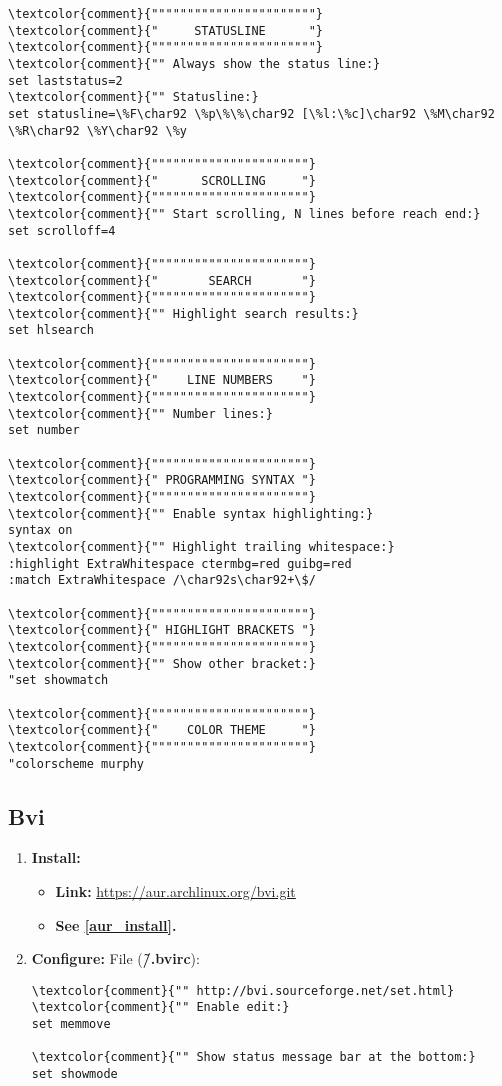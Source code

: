 \documentclass[10pt, a4paper, onecolumn, openany]{book} %
\begin{document}
\begin{enumerate}
\begin{Verbatim}[commandchars=\\\{\}]
\textcolor{comment}{"""""""""""""""""""""""}
\textcolor{comment}{"     STATUSLINE      "}
\textcolor{comment}{"""""""""""""""""""""""}
\textcolor{comment}{"" Always show the status line:}
set laststatus=2
\textcolor{comment}{"" Statusline:}
set statusline=\%F\char92 \%p\%\%\char92 [\%l:\%c]\char92 \%M\char92 \%R\char92 \%Y\char92 \%y

\textcolor{comment}{""""""""""""""""""""""}
\textcolor{comment}{"      SCROLLING     "}
\textcolor{comment}{""""""""""""""""""""""}
\textcolor{comment}{"" Start scrolling, N lines before reach end:}
set scrolloff=4

\textcolor{comment}{""""""""""""""""""""""}
\textcolor{comment}{"       SEARCH       "}
\textcolor{comment}{""""""""""""""""""""""}
\textcolor{comment}{"" Highlight search results:}
set hlsearch

\textcolor{comment}{""""""""""""""""""""""}
\textcolor{comment}{"    LINE NUMBERS    "}
\textcolor{comment}{""""""""""""""""""""""}
\textcolor{comment}{"" Number lines:}
set number

\textcolor{comment}{""""""""""""""""""""""}
\textcolor{comment}{" PROGRAMMING SYNTAX "}
\textcolor{comment}{""""""""""""""""""""""}
\textcolor{comment}{"" Enable syntax highlighting:}
syntax on
\textcolor{comment}{"" Highlight trailing whitespace:}
:highlight ExtraWhitespace ctermbg=red guibg=red
:match ExtraWhitespace /\char92s\char92+\$/

\textcolor{comment}{""""""""""""""""""""""}
\textcolor{comment}{" HIGHLIGHT BRACKETS "}
\textcolor{comment}{""""""""""""""""""""""}
\textcolor{comment}{"" Show other bracket:}
"set showmatch

\textcolor{comment}{""""""""""""""""""""""}
\textcolor{comment}{"    COLOR THEME     "}
\textcolor{comment}{""""""""""""""""""""""}
"colorscheme murphy
\end{Verbatim}
\subsection{Bvi}
\begin{enumerate}
    \item \textbf{Install:}
    \begin{itemize}
        \item \textbf{Link:} \underline{\href{https://aur.archlinux.org/bvi.git}{https://aur.archlinux.org/bvi.git}}
        \item \textbf{See \underline{\ref{aur_install}}.}
    \end{itemize}
    \item \textbf{Configure:}
\newline File (\textbf{\textcolor{file}{\~/.bvirc}}):
\begin{Verbatim}[commandchars=\\\{\}]
\textcolor{comment}{"" http://bvi.sourceforge.net/set.html}
\textcolor{comment}{"" Enable edit:}
set memmove

\textcolor{comment}{"" Show status message bar at the bottom:}
set showmode
\end{Verbatim}
\end{enumerate}
\end{enumerate}
\end{document}
